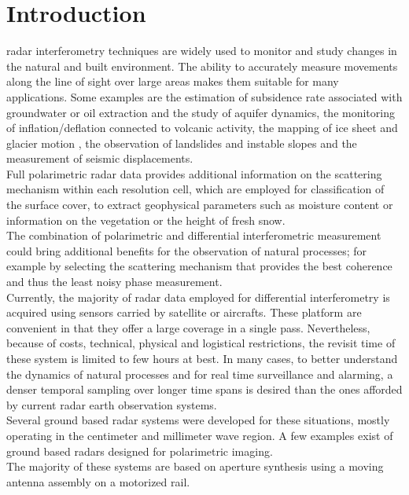 \section{Introduction}
 radar interferometry\cite{Gabriel1989, Massonnet1993} techniques are widely used  to monitor and study changes in the natural and built environment. The ability to accurately measure movements along the line of sight over large areas makes them suitable for many  applications. Some examples are the estimation of subsidence rate associated with groundwater or oil extraction and the study of aquifer dynamics\cite{Hudnut1998,Strozzi2001,Galloway2007a}, the monitoring of inflation/deflation connected to volcanic activity\cite{Massonnet1995}, the mapping of ice sheet and glacier motion\cite{Goldstein1993,Mohr1998} , the observation of landslides and instable slopes\cite{Carnec1996,Catani2005} and the measurement of seismic displacements\cite{Massonnet1993b,Zebker1994}.\\
Full polarimetric radar data provides additional information on the scattering mechanism within each resolution cell, which are employed for classification of the surface cover\cite{Cloude1997, Lee1999}, to extract geophysical parameters such as moisture content\cite{Hajnsek2003} or information on the vegetation \cite{Ulaby1987} or the height of fresh snow\cite{Leinss2014}.\\
The combination of polarimetric and differential interferometric measurement could bring additional benefits for the observation of natural processes; for example by selecting the scattering mechanism that provides the best coherence and thus the least noisy phase measurement\cite{Pipia2009a, Iglesias2014b}.\\
Currently, the majority of radar data employed for differential interferometry is acquired using sensors carried by satellite or aircrafts. These platform are convenient in that they offer a large coverage in a single pass. Nevertheless, because of costs, technical, physical and logistical restrictions, the revisit time of these system is limited to few hours at best. 
In many cases, to better understand the dynamics of natural processes and for real time surveillance and alarming, a denser temporal sampling over longer time spans is desired than the ones afforded by current radar earth observation systems.\\
Several ground based radar systems were developed for these situations, mostly operating in the centimeter and millimeter wave region. A few examples exist of ground based radars designed  for polarimetric imaging\cite{Iglesias2014,LEE, Kang2009}.\\
The majority of these systems\cite{Rudolf1999a, Rodelsperger2011, Aguasca2004,Rodelsperger2012} are based on aperture synthesis using a moving antenna assembly on a motorized rail.
